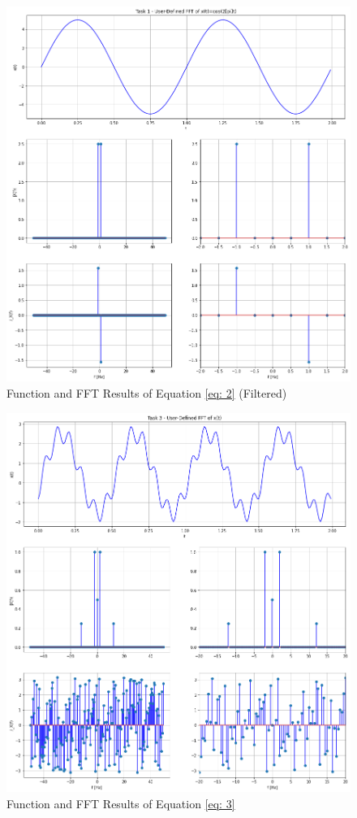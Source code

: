 \documentclass[12pt]{report}
\begin{document}
\begin{figure}[h!]
  \centering
  \includegraphics[width=\linewidth]{p1t2f.png}
  \caption{Function and FFT Results of Equation \eqref{eq: 2} (Filtered)}
  \label{fig: p1t2f}
\end{figure}
\begin{figure}[h!]
  \centering
  \includegraphics[width=\linewidth]{p1t3.png}
  \caption{Function and FFT Results of Equation \eqref{eq: 3}}
  \label{fig: p1t3}
\end{figure}
\end{document}
